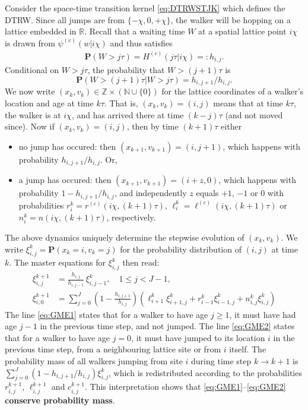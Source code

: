 \documentclass[a4paper,12pt]{elsarticle}
\numberwithin{equation}{section}
\theoremstyle{plain}
\theoremstyle{definition}
\theoremstyle{remark}
\numberwithin{equation}{section}
\newcommand{\spc}{\mathbb R}
\newcommand{\1}{\mathbf 1}
\newcommand{\pr}{\mathbf P}
\begin{document}
Consider the space-time transition kernel \eqref{eq:DTRWSTJK} which defines the DTRW. Since all jumps are from $\{-\chi, 0, +\chi\}$, the walker will be hopping on a lattice embedded in $\spc$.
Recall that a waiting time $W$ at a spatial lattice point $i\chi$ is drawn from $\psi^{(c)}(w | i\chi)$ and thus satisfies
\begin{align}
\pr(W > j\tau) = H^{(c)}(j\tau | i\chi) =: h_{i,j}.
\end{align}
Conditional on $W > j\tau$, the probability that $W > (j + 1) \tau$ is
$$\pr(W > (j + 1)\tau | W > j \tau) = h_{i,j+1} / h_{i,j}.$$
We now write $(x_k,v_k) \in \mathbb Z \times (\mathbb N \cup \{0\})$ for the
lattice coordinates of a walker's location and age at time
$k\tau$. That is, $(x_k, v_k) = (i,j)$
means that at time $k\tau$, the walker is at $i \chi$, and has arrived there at time $(k-j)\tau$ (and not moved since).
Now if $(x_k, v_k) = (i,j)$, then by time $(k+1)\tau$ either
\begin{itemize}
\item
no jump has occured: then $(x_{k+1}, v_{k+1}) = (i,j+1)$, which happens
with probability $h_{i,j+1} / h_{i,j}$. Or,
\item
a jump has occured: then $(x_{k+1}, v_{k+1}) = (i + z, 0)$, which happens with
probability $1-h_{i,j+1} / h_{i,j}$, and independently
$z$ equals $+1$, $-1$ or $0$ with probabilities
$r^k_i = r^{(c)}(i\chi, (k+1)\tau)$, $\ell^k_i = \ell^{(c)}(i\chi, (k+1)\tau)$ or
$n^k_i = n(i\chi, (k+1)\tau)$, respectively.
\end{itemize}
The above dynamics uniquely determine the stepwise evolution of $(x_k, v_k)$.
We write
$\xi^k_{i,j} = \pr(x_k = i, v_k = j)$
for the probability distribution of $(i,j)$ at time $k$.
The master equations for $\xi^k_{i,j}$ then read:
\begin{align}
\label{eq:GME1}
\xi^{k+1}_{i,j} &= \frac{h_{i,j}}{h_{i,j-1}}\, \xi^k_{i,j-1}, \quad 1 \le j < J-1,
\\
\label{eq:GME2}
\xi^{k+1}_{i,0} &= \sum_{j=0}^J\left(1 - \frac{h_{i,j+1}}{h_{i,j}}\right)
(\ell^k_{i+1} \xi^k_{i+1, j} + r^k_{i-1} \xi^k_{i-1,j}
  + n^k_{i,j} \xi^k_{i,j})
\end{align}
The line \eqref{eq:GME1} states that for a walker to have age $j \ge 1$,
it must have had age $j - 1$ in the previous time step, and not jumped.
The line \eqref{eq:GME2} states that for a walker to have age $j = 0$,
it must have jumped to its location $i$ in the previous time step, from a
neighbouring lattice site or from $i$ itself. The probability mass of all
walkers jumping from site $i$ during time step $k \to k+1$ is
$\sum_{j=0}^J \left(1 - h_{i,j+1} / h_{i,j}\right) \xi^k_{i,j}$,
which is redistributed according to the probabilities $r^{k+1}_{i,j}$,
$\ell^{k+1}_{i,j}$ and $c^{k+1}_{i,j}$.
This interpretation shows that \eqref{eq:GME1}--\eqref{eq:GME2}
\textbf{conserve probability mass}.
\end{document}
